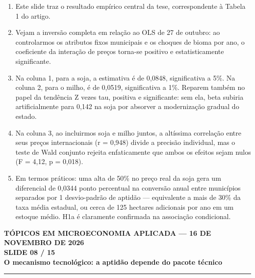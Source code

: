 \documentclass[11pt,a4paper]{article}
\newcommand{\slidenum}{1}
\begin{document}
\vspace{0.8mm}
\begin{enumerate}[leftmargin=*,label=\textbf{(\arabic*)},itemsep=2.8mm,topsep=1mm]
    \item Este slide traz o resultado empírico central da tese, correspondente à Tabela 1 do artigo.
    \item Vejam a inversão completa em relação ao OLS de 27 de outubro: ao controlarmos os atributos fixos municipais e os choques de bioma por ano, o coeficiente da interação de preços torna-se positivo e estatisticamente significante.
    \item Na coluna 1, para a soja, a estimativa é de 0,0848, significativa a 5\%. Na coluna 2, para o milho, é de 0,0519, significativa a 1\%. Reparem também no papel da tendência Z vezes tau, positiva e significante: sem ela, beta subiria artificialmente para 0,142 na soja por absorver a modernização gradual do estado.
    \item Na coluna 3, ao incluirmos soja e milho juntos, a altíssima correlação entre seus preços internacionais (r = 0,948) divide a precisão individual, mas o teste de Wald conjunto rejeita enfaticamente que ambos os efeitos sejam nulos (F = 4,12, p = 0,018).
    \item Em termos práticos: uma alta de 50\% no preço real da soja gera um diferencial de 0,0344 ponto percentual na conversão anual entre municípios separados por 1 desvio-padrão de aptidão — equivalente a mais de 30\% da taxa média estadual, ou cerca de 125 hectares adicionais por ano em um estoque médio. H1a é claramente confirmada na associação condicional.
\end{enumerate}

\newpage

\renewcommand{\slidenum}{8}
\noindent
\begin{minipage}{\textwidth}
\begin{center}
{\color{cinza}\footnotesize\textbf{TÓPICOS EM MICROECONOMIA APLICADA --- 16 DE NOVEMBRO DE 2026}\\[1.2mm]}
{\color{cinza}\bfseries\Large SLIDE 08 / 15\\[1.5mm]}
{\color{verde}\bfseries\LARGE O mecanismo tecnológico: a aptidão depende do pacote técnico\\[2.5mm]}
\rule{\textwidth}{1pt}
\end{center}
\end{minipage}
\vspace{1.5mm}
\end{document}
